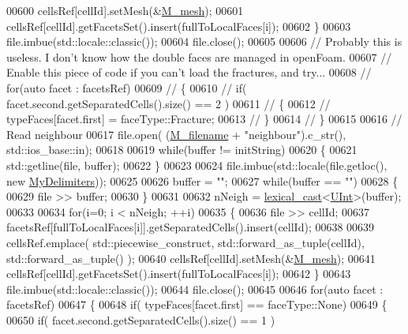\begin{DoxyCode}
00600         cellsRef[cellId].setMesh(&\hyperlink{classFVCode3D_1_1Importer_a6f1542d6c6ac192e36c8eec7dc366653}{M\_mesh});
00601         cellsRef[cellId].getFacetsSet().insert(fullToLocalFaces[i]);
00602     \}
00603     file.imbue(std::locale::classic());
00604     file.close();
00605 
00606 \textcolor{comment}{// Probably this is useless. I don't know how the double faces are managed in openFoam.}
00607 \textcolor{comment}{// Enable this piece of code if you can't load the fractures, and try...}
00608 \textcolor{comment}{//    for(auto facet : facetsRef)}
00609 \textcolor{comment}{//    \{}
00610 \textcolor{comment}{//        if( facet.second.getSeparatedCells().size() == 2 )}
00611 \textcolor{comment}{//        \{}
00612 \textcolor{comment}{//            typeFaces[facet.first] = faceType::Fracture;}
00613 \textcolor{comment}{//        \}}
00614 \textcolor{comment}{//    \}}
00615 
00616     \textcolor{comment}{// Read neighbour}
00617     file.open( (\hyperlink{classFVCode3D_1_1Importer_a318e689fb93c5c906f85aa13685724d7}{M\_filename} + \textcolor{stringliteral}{"neighbour"}).c\_str(), std::ios\_base::in);
00618 
00619     \textcolor{keywordflow}{while}(buffer != initString)
00620     \{
00621         std::getline(file, buffer);
00622     \}
00623 
00624     file.imbue(std::locale(file.getloc(), \textcolor{keyword}{new} \hyperlink{structFVCode3D_1_1MyDelimiters}{MyDelimiters}));
00625 
00626     buffer = \textcolor{stringliteral}{""};
00627     \textcolor{keywordflow}{while}(buffer == \textcolor{stringliteral}{""})
00628     \{
00629         file >> buffer;
00630     \}
00631 
00632     nNeigh = \hyperlink{namespaceFVCode3D_a7d8605df83383ec5cf62f7efe480a68a}{lexical\_cast}<\hyperlink{namespaceFVCode3D_a4bf7e328c75d0fd504050d040ebe9eda}{UInt}>(buffer);
00633 
00634     \textcolor{keywordflow}{for}(i=0; i < nNeigh; ++i)
00635     \{
00636         file >> cellId;
00637         facetsRef[fullToLocalFaces[i]].getSeparatedCells().insert(cellId);
00638 
00639         cellsRef.emplace( std::piecewise\_construct, std::forward\_as\_tuple(cellId), std::forward\_as\_tuple() 
      );
00640         cellsRef[cellId].setMesh(&\hyperlink{classFVCode3D_1_1Importer_a6f1542d6c6ac192e36c8eec7dc366653}{M\_mesh});
00641         cellsRef[cellId].getFacetsSet().insert(fullToLocalFaces[i]);
00642     \}
00643     file.imbue(std::locale::classic());
00644     file.close();
00645 
00646     \textcolor{keywordflow}{for}(\textcolor{keyword}{auto} facet : facetsRef)
00647     \{
00648         \textcolor{keywordflow}{if}( typeFaces[facet.first] == faceType::None)
00649         \{
00650             \textcolor{keywordflow}{if}( facet.second.getSeparatedCells().size() == 1 )

\end{DoxyCode}
